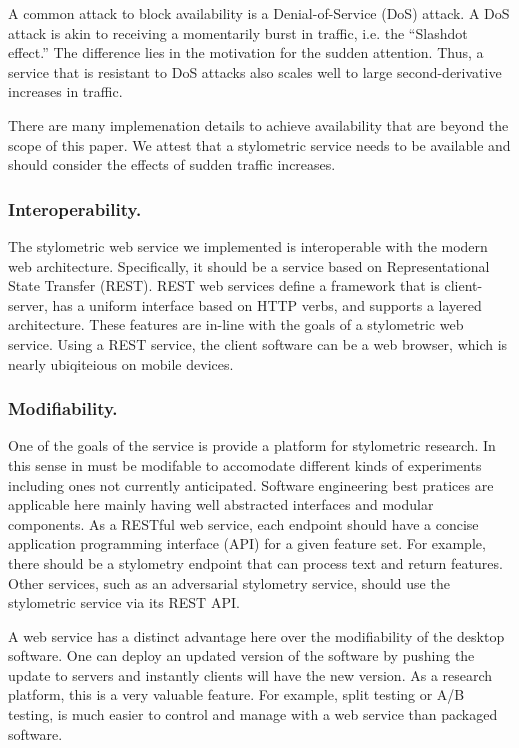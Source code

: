 \documentclass[letterpaper]{article}
\begin{document}
A common attack to block availability is a Denial-of-Service (DoS)
attack.  A DoS attack is akin to receiving a momentarily burst in
traffic, i.e. the ``Slashdot effect.''  The difference lies in the
motivation for the sudden attention.  Thus, a service that is
resistant to DoS attacks also scales well to large second-derivative
increases in traffic.

There are many implemenation details to achieve availability that are
beyond the scope of this paper.  We attest that a stylometric service
needs to be available and should consider the effects of sudden
traffic increases.

\subsubsection{Interoperability.}

The stylometric web service we implemented is interoperable with the modern
web architecture.  Specifically, it should be a service based on
Representational State Transfer (REST)\cite{Fielding2000}.  REST web
services define a framework that is client-server, has a uniform
interface based on HTTP verbs, and supports a layered architecture.
These features are in-line with the goals of a stylometric web
service.  Using a REST service, the client software can be a web
browser, which is nearly ubiqiteious on mobile devices.

\subsubsection{Modifiability.}

One of the goals of the service is provide a platform for stylometric
research.  In this sense in must be modifable to accomodate different
kinds of experiments including ones not currently anticipated.
Software engineering best pratices are applicable here mainly having
well abstracted interfaces and modular components.  As a RESTful web
service, each endpoint should have a concise application programming
interface (API) for a given feature set.  For example, there should be
a stylometry endpoint that can process text and return features.
Other services, such as an adversarial stylometry service, should use
the stylometric service via its REST API.

A web service has a distinct advantage here over the modifiability of
the desktop software.  One can deploy an updated version of the
software by pushing the update to servers and instantly clients will
have the new version.  As a research platform, this is a very valuable
feature.  For example, split testing or A/B testing, is much easier to
control and manage with a web service than packaged software.
\end{document}
